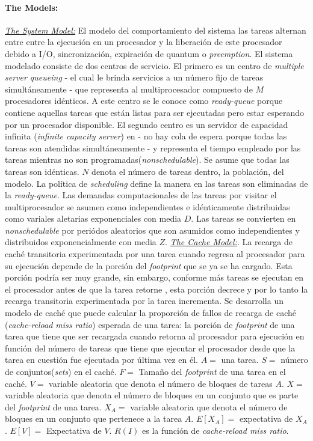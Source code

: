 \paragraph{\textnormal{\textbf{The Models:}}}
\underline{\textit{The System Model:}} El modelo del comportamiento del sistema las tareas alternan entre entre la ejecución en un procesador y la liberación de este procesador debido a I/O, sincronización, expiración de quantum o \textit{preemption}. El sistema modelado consiste de dos centros de servicio. El primero es un centro de \textit{multiple server queueing} - el cual le brinda servicios a un número fijo de tareas simultáneamente - que representa al multiprocesador compuesto de $M$ procesadores idénticos. A este centro se le conoce como \textit{ready-queue} porque contiene aquellas tareas que están listas para ser ejecutadas pero estar esperando por un procesador disponible. El segundo centro es un servidor de capacidad infinita (\textit{infinite capacity server}) en - no hay cola de espera porque todas las tareas son atendidas simultáneamente - y representa el tiempo empleado por las tareas mientras no son programadas(\textit{nonschedulable}). Se asume que todas las tareas son idénticas. $N$ denota el número de tareas dentro, la población, del modelo. La política de \textit{scheduling} define la manera en las tareas son eliminadas de la \textit{ready-queue}. Las demandas computacionales de las tareas por visitar el multiprocesador se asumen como independientes e idénticamente distribuidas como variales aletarias exponenciales con media $D$. Las tareas se convierten en \textit{nonschedulable} por periódos aleatorios que son asumidos como independientes y distribuidos exponencialmente con media $Z$. \underline{\textit{The Cache Model:}}. La recarga de caché transitoria experimentada por una tarea cuando regresa al procesador para su ejecución depende de la porción del \textit{footprint} que se ya se ha cargado. Esta porción podría ser muy grande, sin embargo, conforme más tareas se ejecutan en el procesador antes de que la tarea retorne , esta porción decrece y por lo tanto la recarga transitoria experimentada por la tarea incrementa. Se desarrolla un modelo de caché que puede calcular la  proporción de fallos de recarga de caché (\textit{cache-reload miss ratio}) esperada de una tarea: la porción de \textit{footprint} de una tarea que tiene que ser recargada cuando retorna al procesador para ejecución en función del número de tareas que tiene que ejecutar el procesador desde que la tarea en cuestión fue ejecutada por última vez en él. $A = $ una tarea. $S = $ número de conjuntos(\textit{sets}) en el caché. $F = $ Tamaño del \textit{footprint} de una tarea en el caché. $V = $ variable aleatoria que denota el número de bloques de tareas $A$. $X = $ variable aleatoria que denota el número de bloques en un conjunto que es parte del \textit{footprint} de una tarea. $X_A = $ variable aleatoria que denota el número de bloques en un conjunto que pertenece a la tarea $A$. $E[X_A] = $ expectativa de $X_A$. $E[V] = $ Expectativa de $V$. $R(I)$ es la función de \textit{cache-reload miss ratio}.

